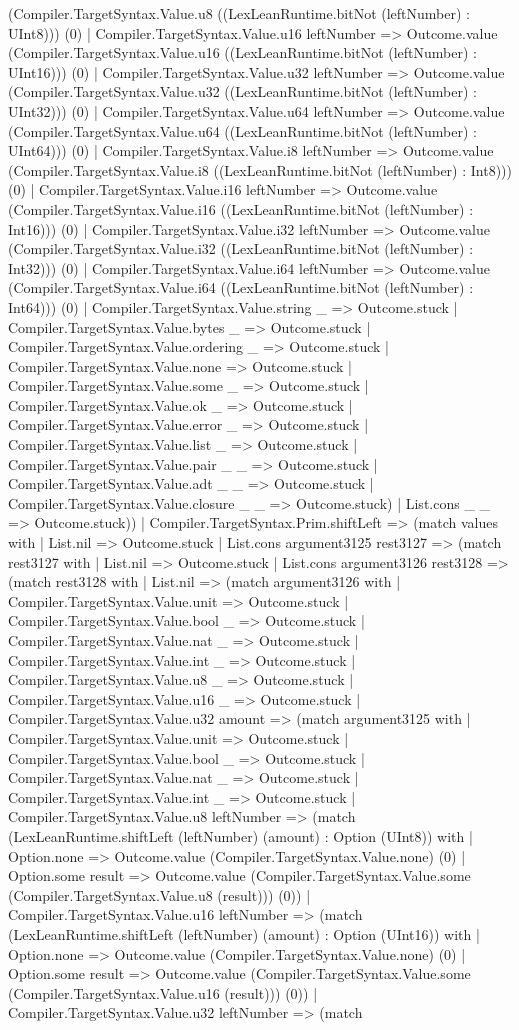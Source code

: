 \documentclass[11pt]{article}
\begin{document}
(Compiler.TargetSyntax.Value.u8 ((LexLeanRuntime.bitNot (leftNumber) : UInt8))) (0) | Compiler.TargetSyntax.Value.u16 leftNumber => Outcome.value (Compiler.TargetSyntax.Value.u16 ((LexLeanRuntime.bitNot (leftNumber) : UInt16))) (0) | Compiler.TargetSyntax.Value.u32 leftNumber => Outcome.value (Compiler.TargetSyntax.Value.u32 ((LexLeanRuntime.bitNot (leftNumber) : UInt32))) (0) | Compiler.TargetSyntax.Value.u64 leftNumber => Outcome.value (Compiler.TargetSyntax.Value.u64 ((LexLeanRuntime.bitNot (leftNumber) : UInt64))) (0) | Compiler.TargetSyntax.Value.i8 leftNumber => Outcome.value (Compiler.TargetSyntax.Value.i8 ((LexLeanRuntime.bitNot (leftNumber) : Int8))) (0) | Compiler.TargetSyntax.Value.i16 leftNumber => Outcome.value (Compiler.TargetSyntax.Value.i16 ((LexLeanRuntime.bitNot (leftNumber) : Int16))) (0) | Compiler.TargetSyntax.Value.i32 leftNumber => Outcome.value (Compiler.TargetSyntax.Value.i32 ((LexLeanRuntime.bitNot (leftNumber) : Int32))) (0) | Compiler.TargetSyntax.Value.i64 leftNumber => Outcome.value (Compiler.TargetSyntax.Value.i64 ((LexLeanRuntime.bitNot (leftNumber) : Int64))) (0) | Compiler.TargetSyntax.Value.string \_ => Outcome.stuck | Compiler.TargetSyntax.Value.bytes \_ => Outcome.stuck | Compiler.TargetSyntax.Value.ordering \_ => Outcome.stuck | Compiler.TargetSyntax.Value.none => Outcome.stuck | Compiler.TargetSyntax.Value.some \_ => Outcome.stuck | Compiler.TargetSyntax.Value.ok \_ => Outcome.stuck | Compiler.TargetSyntax.Value.error \_ => Outcome.stuck | Compiler.TargetSyntax.Value.list \_ => Outcome.stuck | Compiler.TargetSyntax.Value.pair \_ \_ => Outcome.stuck | Compiler.TargetSyntax.Value.adt \_ \_ => Outcome.stuck | Compiler.TargetSyntax.Value.closure \_ \_ => Outcome.stuck) | List.cons \_ \_ => Outcome.stuck)) | Compiler.TargetSyntax.Prim.shiftLeft => (match values with | List.nil => Outcome.stuck | List.cons argument3125 rest3127 => (match rest3127 with | List.nil => Outcome.stuck | List.cons argument3126 rest3128 => (match rest3128 with | List.nil => (match argument3126 with | Compiler.TargetSyntax.Value.unit => Outcome.stuck | Compiler.TargetSyntax.Value.bool \_ => Outcome.stuck | Compiler.TargetSyntax.Value.nat \_ => Outcome.stuck | Compiler.TargetSyntax.Value.int \_ => Outcome.stuck | Compiler.TargetSyntax.Value.u8 \_ => Outcome.stuck | Compiler.TargetSyntax.Value.u16 \_ => Outcome.stuck | Compiler.TargetSyntax.Value.u32 amount => (match argument3125 with | Compiler.TargetSyntax.Value.unit => Outcome.stuck | Compiler.TargetSyntax.Value.bool \_ => Outcome.stuck | Compiler.TargetSyntax.Value.nat \_ => Outcome.stuck | Compiler.TargetSyntax.Value.int \_ => Outcome.stuck | Compiler.TargetSyntax.Value.u8 leftNumber => (match (LexLeanRuntime.shiftLeft (leftNumber) (amount) : Option (UInt8)) with | Option.none => Outcome.value (Compiler.TargetSyntax.Value.none) (0) | Option.some result => Outcome.value (Compiler.TargetSyntax.Value.some (Compiler.TargetSyntax.Value.u8 (result))) (0)) | Compiler.TargetSyntax.Value.u16 leftNumber => (match (LexLeanRuntime.shiftLeft (leftNumber) (amount) : Option (UInt16)) with | Option.none => Outcome.value (Compiler.TargetSyntax.Value.none) (0) | Option.some result => Outcome.value (Compiler.TargetSyntax.Value.some (Compiler.TargetSyntax.Value.u16 (result))) (0)) | Compiler.TargetSyntax.Value.u32 leftNumber => (match 
\end{document}

